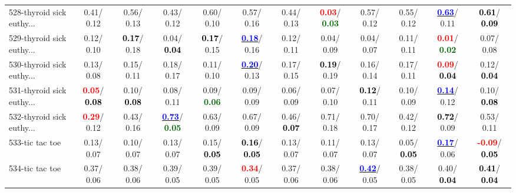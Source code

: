 \begin{table}[h]
\begin{center}
{\begin{tabular}{lc|c|c|c|c|c|c|c|c|c|c}
528-thyroid sick euthy... &   0.41/  0.12 &   0.56/  0.13 &   0.43/  0.12 &   0.60/  0.10 &   0.57/  0.16 &   0.44/  0.13 & \textcolor{red}{\textbf{  0.03}}/\textcolor{darkgreen}{\textbf{  0.03}} &   0.57/  0.12 &   0.55/  0.12 & \underline{\textcolor{blue}{\textbf{  0.63}}}/  0.11 & \textcolor{black}{\textbf{  0.61}}/\textcolor{black}{\textbf{  0.09}} \\
529-thyroid sick euthy... &   0.12/  0.10 & \textcolor{black}{\textbf{  0.17}}/  0.18 &   0.04/\textcolor{black}{\textbf{  0.04}} & \textcolor{black}{\textbf{  0.17}}/  0.15 & \underline{\textcolor{blue}{\textbf{  0.18}}}/  0.16 &   0.12/  0.11 &   0.04/  0.09 &   0.04/  0.07 &   0.11/  0.11 & \textcolor{red}{\textbf{  0.01}}/\textcolor{darkgreen}{\textbf{  0.02}} &   0.07/  0.08 \\
530-thyroid sick euthy... &   0.13/  0.08 &   0.15/  0.11 &   0.18/  0.17 &   0.11/  0.10 & \underline{\textcolor{blue}{\textbf{  0.20}}}/  0.13 &   0.17/  0.15 & \textcolor{black}{\textbf{  0.19}}/  0.19 &   0.16/  0.14 &   0.17/  0.11 & \textcolor{red}{\textbf{  0.09}}/\textcolor{black}{\textbf{  0.04}} &   0.12/\textcolor{black}{\textbf{  0.04}} \\
531-thyroid sick euthy... & \textcolor{red}{\textbf{  0.05}}/\textcolor{black}{\textbf{  0.08}} &   0.10/\textcolor{black}{\textbf{  0.08}} &   0.08/  0.11 &   0.09/\textcolor{darkgreen}{\textbf{  0.06}} &   0.09/  0.09 &   0.06/  0.09 &   0.07/  0.10 & \textcolor{black}{\textbf{  0.12}}/  0.11 &   0.10/  0.09 & \underline{\textcolor{blue}{\textbf{  0.14}}}/  0.12 &   0.10/\textcolor{black}{\textbf{  0.08}} \\
532-thyroid sick euthy... & \textcolor{red}{\textbf{  0.29}}/  0.12 &   0.43/  0.16 & \underline{\textcolor{blue}{\textbf{  0.73}}}/\textcolor{darkgreen}{\textbf{  0.05}} &   0.63/  0.09 &   0.67/  0.09 &   0.46/\textcolor{black}{\textbf{  0.07}} &   0.71/  0.18 &   0.70/  0.17 &   0.42/  0.12 & \textcolor{black}{\textbf{  0.72}}/  0.09 &   0.53/  0.11 \\
533-tic tac toe &   0.13/  0.07 &   0.10/  0.07 &   0.13/  0.07 &   0.15/\textcolor{black}{\textbf{  0.05}} & \textcolor{black}{\textbf{  0.16}}/\textcolor{black}{\textbf{  0.05}} &   0.13/  0.07 &   0.11/  0.07 &   0.13/  0.07 &   0.05/\textcolor{black}{\textbf{  0.05}} & \underline{\textcolor{blue}{\textbf{  0.17}}}/  0.06 & \textcolor{red}{\textbf{ -0.09}}/\textcolor{black}{\textbf{  0.05}} \\ \hline
534-tic tac toe &   0.37/  0.06 &   0.38/  0.06 &   0.39/  0.05 &   0.39/  0.05 & \textcolor{red}{\textbf{  0.34}}/  0.05 &   0.37/  0.06 &   0.38/  0.06 & \underline{\textcolor{blue}{\textbf{  0.42}}}/  0.05 &   0.38/  0.05 &   0.40/\textcolor{black}{\textbf{  0.04}} & \textcolor{black}{\textbf{  0.41}}/\textcolor{black}{\textbf{  0.04}} \\

\end{tabular}}
\end{center}
\end{table}
